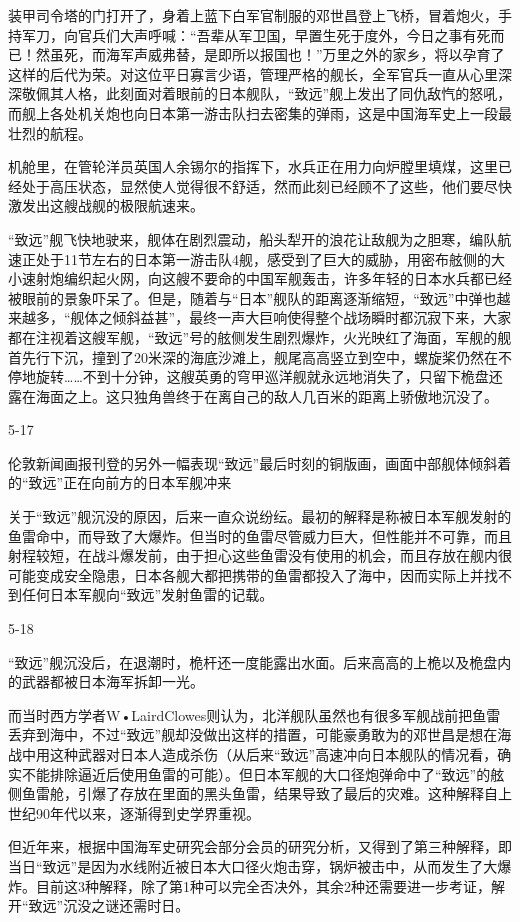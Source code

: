 \documentclass[12pt,UTF8]{ctexbook}
\begin{document}
装甲司令塔的门打开了，身着上蓝下白军官制服的邓世昌登上飞桥，冒着炮火，手持军刀，向官兵们大声呼喊：“吾辈从军卫国，早置生死于度外，今日之事有死而已！然虽死，而海军声威弗替，是即所以报国也！”万里之外的家乡，将以孕育了这样的后代为荣。对这位平日寡言少语，管理严格的舰长，全军官兵一直从心里深深敬佩其人格，此刻面对着眼前的日本舰队，“致远”舰上发出了同仇敌忾的怒吼，而舰上各处机关炮也向日本第一游击队扫去密集的弹雨，这是中国海军史上一段最壮烈的航程。

机舱里，在管轮洋员英国人余锡尔的指挥下，水兵正在用力向炉膛里填煤，这里已经处于高压状态，显然使人觉得很不舒适，然而此刻已经顾不了这些，他们要尽快激发出这艘战舰的极限航速来。

“致远”舰飞快地驶来，舰体在剧烈震动，船头犁开的浪花让敌舰为之胆寒，编队航速正处于11节左右的日本第一游击队4舰，感受到了巨大的威胁，用密布舷侧的大小速射炮编织起火网，向这艘不要命的中国军舰轰击，许多年轻的日本水兵都已经被眼前的景象吓呆了。但是，随着与“日本”舰队的距离逐渐缩短，“致远”中弹也越来越多，“舰体之倾斜益甚”，最终一声大巨响使得整个战场瞬时都沉寂下来，大家都在注视着这艘军舰，“致远”号的舷侧发生剧烈爆炸，火光映红了海面，军舰的舰首先行下沉，撞到了20米深的海底沙滩上，舰尾高高竖立到空中，螺旋桨仍然在不停地旋转……不到十分钟，这艘英勇的穹甲巡洋舰就永远地消失了，只留下桅盘还露在海面之上。这只独角兽终于在离自己的敌人几百米的距离上骄傲地沉没了。

5-17

伦敦新闻画报刊登的另外一幅表现“致远”最后时刻的铜版画，画面中部舰体倾斜着的“致远”正在向前方的日本军舰冲来

关于“致远”舰沉没的原因，后来一直众说纷纭。最初的解释是称被日本军舰发射的鱼雷命中，而导致了大爆炸。但当时的鱼雷尽管威力巨大，但性能并不可靠，而且射程较短，在战斗爆发前，由于担心这些鱼雷没有使用的机会，而且存放在舰内很可能变成安全隐患，日本各舰大都把携带的鱼雷都投入了海中，因而实际上并找不到任何日本军舰向“致远”发射鱼雷的记载。

5-18

“致远”舰沉没后，在退潮时，桅杆还一度能露出水面。后来高高的上桅以及桅盘内的武器都被日本海军拆卸一光。

而当时西方学者W•LairdClowes则认为，北洋舰队虽然也有很多军舰战前把鱼雷丢弃到海中，不过“致远”舰却没做出这样的措置，可能豪勇敢为的邓世昌是想在海战中用这种武器对日本人造成杀伤（从后来“致远”高速冲向日本舰队的情况看，确实不能排除逼近后使用鱼雷的可能）。但日本军舰的大口径炮弹命中了“致远”的舷侧鱼雷舱，引爆了存放在里面的黑头鱼雷，结果导致了最后的灾难。这种解释自上世纪90年代以来，逐渐得到史学界重视。

但近年来，根据中国海军史研究会部分会员的研究分析，又得到了第三种解释，即当日“致远”是因为水线附近被日本大口径火炮击穿，锅炉被击中，从而发生了大爆炸。目前这3种解释，除了第1种可以完全否决外，其余2种还需要进一步考证，解开“致远”沉没之谜还需时日。
\end{document}
